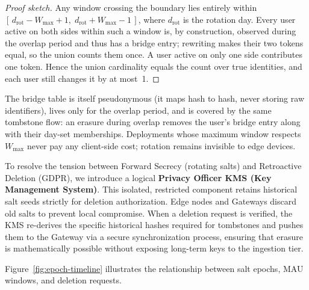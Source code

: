 \documentclass[sigconf,anonymous,review]{acmart}
\begin{document}
\begin{proof}[Proof sketch]
    Any window crossing the boundary lies entirely within $[\,d_{\mathrm{rot}} - W_{\max} + 1,\; d_{\mathrm{rot}} + W_{\max} - 1\,]$, where $d_{\mathrm{rot}}$ is the rotation day. Every user active on both sides within such a window is, by construction, observed during the overlap period and thus has a bridge entry; rewriting makes their two tokens equal, so the union counts them once. A user active on only one side contributes one token. Hence the union cardinality equals the count over true identities, and each user still changes it by at most~1.
\end{proof}

The bridge table is itself pseudonymous (it maps hash to hash, never storing raw identifiers), lives only for the overlap period, and is covered by the same tombstone flow: an erasure during overlap removes the user's bridge entry along with their day-set memberships. Deployments whose maximum window respects $W_{\max}$ never pay any client-side cost; rotation remains invisible to edge devices.

To resolve the tension between Forward Secrecy (rotating salts) and Retroactive Deletion (GDPR), we introduce a logical \textbf{Privacy Officer KMS (Key Management System)}. This isolated, restricted component retains historical salt seeds strictly for deletion authorization. Edge nodes and Gateways discard old salts to prevent local compromise. When a deletion request is verified, the KMS re-derives the specific historical hashes required for tombstones and pushes them to the Gateway via a secure synchronization process, ensuring that erasure is mathematically possible without exposing long-term keys to the ingestion tier.

Figure~\ref{fig:epoch-timeline} illustrates the relationship between salt epochs, MAU windows, and deletion requests.
\end{document}
